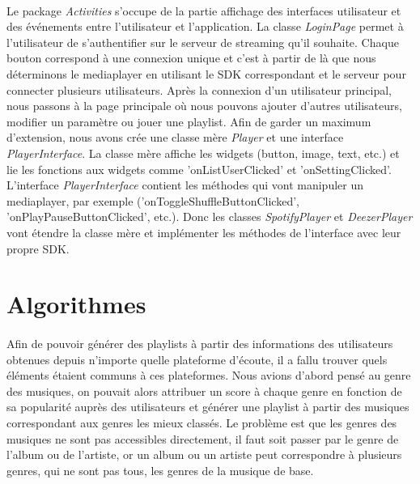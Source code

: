 \documentclass[12pt, openany]{report}
\begin{document}
\paragraph{}Le package \textit{Activities} s'occupe de la partie affichage des interfaces utilisateur et des événements entre l'utilisateur et l'application. La classe \textit{LoginPage} permet à l'utilisateur de s'authentifier sur le serveur de streaming qu'il souhaite. Chaque bouton correspond à une connexion unique et c'est à partir de là que nous déterminons le mediaplayer en utilisant le SDK correspondant et le serveur pour connecter plusieurs utilisateurs. Après la connexion d'un utilisateur principal, nous passons à la page principale où nous pouvons ajouter d'autres utilisateurs, modifier un paramètre ou jouer une playlist. Afin de garder un maximum d'extension, nous avons crée une classe mère \textit{Player} et une interface \textit{PlayerInterface}. La classe mère affiche les widgets (button, image, text, etc.) et lie les fonctions aux widgets comme 'onListUserClicked' et 'onSettingClicked'. L'interface \textit{PlayerInterface} contient les méthodes qui vont manipuler un mediaplayer, par exemple ('onToggleShuffleButtonClicked', 'onPlayPauseButtonClicked', etc.). Donc les classes \textit{SpotifyPlayer} et \textit{DeezerPlayer} vont étendre la classe mère et implémenter les méthodes de l'interface avec leur propre SDK.

\section{Algorithmes}
\paragraph{}Afin de pouvoir générer des playlists à partir des informations des utilisateurs obtenues depuis n’importe quelle plateforme d’écoute, il a fallu trouver quels éléments étaient communs à ces plateformes. Nous avions d’abord pensé au genre des musiques, on pouvait alors attribuer un score à chaque genre en fonction de sa popularité auprès des utilisateurs et générer une playlist à partir des musiques correspondant aux genres les mieux classés. Le problème est que les genres des musiques ne sont pas accessibles directement, il faut soit passer par le genre de l’album ou de l’artiste, or un album ou un artiste peut correspondre à plusieurs genres, qui ne sont pas tous, les genres de la musique de base. 
\end{document}
